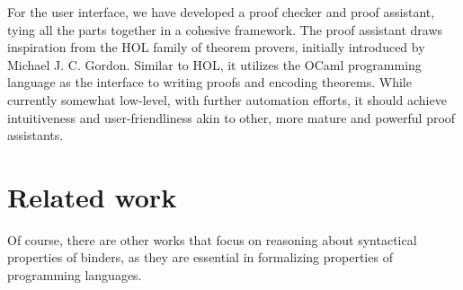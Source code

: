 \documentclass[english, mgr]{iithesis}
\begin{document}
For the user interface, we have developed a proof checker and proof assistant,
tying all the parts together in a cohesive framework.
The proof assistant draws inspiration from the HOL family of theorem provers,
initially introduced by Michael J. C. Gordon\cite{HOL}.
Similar to HOL, it utilizes the OCaml programming language as the
interface to writing proofs and encoding theorems.
While currently somewhat low-level, with further automation efforts,
it should achieve intuitiveness and user-friendliness akin to other,
more mature and powerful proof assistants.

\section{Related work}
Of course, there are other works that focus on reasoning about
syntactical properties of binders, as they are essential
in formalizing properties of programming languages.
\end{document}
